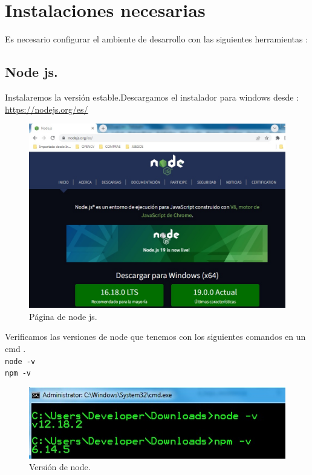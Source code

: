 \chapter{Instalaciones necesarias}
Es necesario configurar el ambiente de  desarrollo con las siguientes herramientas :\\
\section{Node js.}
Instalaremos la versi\'on estable.Descargamos el instalador para windows desde :\\
\url{https://nodejs.org/es/}\\
\begin{figure}[H] %
	\centering %
	\includegraphics[scale=0.4]{images/c1_1.jpg}
	\caption{P\'agina de node js.}
\end{figure}
Verificamos las versiones de node que tenemos con los siguientes comandos en un cmd .\\
\texttt{node -v}\\
\texttt{npm -v}\\
\begin{figure}[H] %
	\centering %
	\includegraphics[scale=0.7]{images/c1_2.jpg}
	\caption{Versi\'on de node.}
\end{figure}
